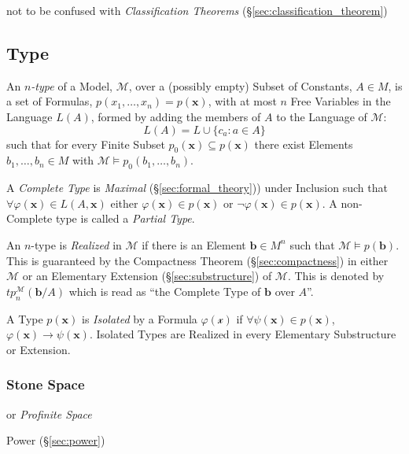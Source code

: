 \fist not to be confused with \emph{Classification Theorems}
(\S\ref{sec:classification_theorem})



\subsection{Type}\label{sec:model_type}

An \emph{$n$-type} of a Model, $\mathcal{M}$, over a (possibly empty)
Subset of Constants, $A \in M$, is a set of Formulas,
$p(x_1,\ldots,x_n) = p(\mathbf{x})$, with at most $n$ Free Variables
in the Language $L(A)$, formed by adding the members of $A$ to the
Language of $\mathcal{M}$:
\[
  L(A) = L \cup \{ c_a : a \in A \}
\]
such that for every Finite Subset $p_0(\mathbf{x}) \subseteq
p(\mathbf{x})$ there exist Elements $b_1,\ldots,b_n \in M$ with
$\mathcal{M} \models p_0(b_1,\ldots,b_n)$.

A \emph{Complete Type} is \emph{Maximal} (\S\ref{sec:formal_theory}))
under Inclusion such that $\forall \varphi(\mathbf{x}) \in
L(A,\mathbf{x})$ either $\varphi(\mathbf{x}) \in p(\mathbf{x})$ or
$\neg \varphi(\mathbf{x}) \in p(\mathbf{x})$. A non-Complete type is
called a \emph{Partial Type}.

An $n$-type is \emph{Realized} in $\mathcal{M}$ if there is an Element
$\mathbf{b} \in M^n$ such that $\mathcal{M} \models p(\mathbf{b})$.
This is guaranteed by the Compactness Theorem
(\S\ref{sec:compactness}) in either $\mathcal{M}$ or an Elementary
Extension (\S\ref{sec:substructure}) of $\mathcal{M}$. This is denoted
by $tp_{n}^{\mathcal{M}}(\mathbf{b}/A)$ which is read as ``the
Complete Type of $\mathbf{b}$ over $A$''.

A Type $p(\mathbf{x})$ is \emph{Isolated} by a Formula
$\varphi(\mathcal{x})$ if $\forall \psi(\mathbf{x}) \in
p(\mathbf{x})$, $\varphi (\mathbf{x}) \rightarrow
\psi(\mathbf{x})$. Isolated Types are Realized in every Elementary
Substructure or Extension.



\subsubsection{Stone Space}\label{sec:stone_space}

or \emph{Profinite Space}

Power (\S\ref{sec:power})

